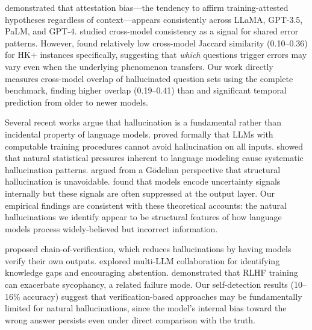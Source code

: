 \citet{mckenna2023sources} demonstrated that attestation bias---the tendency to affirm training-attested hypotheses regardless of context---appears consistently across LLaMA, GPT-3.5, PaLM, and GPT-4.
\citet{finch2025crossmodel} studied cross-model consistency as a signal for shared error patterns.
However, \citet{simhi2024distinguishing} found relatively low cross-model Jaccard similarity (0.10--0.36) for HK$+$ instances specifically, suggesting that \emph{which} questions trigger errors may vary even when the underlying phenomenon transfers.
Our work directly measures cross-model overlap of hallucinated question sets using the complete \truthfulqa benchmark, finding higher overlap (0.19--0.41) than \citet{simhi2024distinguishing} and significant temporal prediction from older to newer models.

Several recent works argue that hallucination is a fundamental rather than incidental property of language models.
\citet{xu2024hallucination} proved formally that LLMs with computable training procedures cannot avoid hallucination on all inputs.
\citet{kalai2025hallucinate} showed that natural statistical pressures inherent to language modeling cause systematic hallucination patterns.
\citet{banerjee2024llms} argued from a G\"{o}delian perspective that structural hallucination is unavoidable.
\citet{hager2025phenomenology} found that models encode uncertainty signals internally but these signals are often suppressed at the output layer.
Our empirical findings are consistent with these theoretical accounts: the natural hallucinations we identify appear to be structural features of how language models process widely-believed but incorrect information.

\citet{dhuliawala2023chain} proposed chain-of-verification, which reduces hallucinations by having models verify their own outputs.
\citet{feng2024dont} explored multi-LLM collaboration for identifying knowledge gaps and encouraging abstention.
\citet{sharma2024sycophancy} demonstrated that RLHF training can exacerbate sycophancy, a related failure mode.
Our self-detection results (10--16\% accuracy) suggest that verification-based approaches may be fundamentally limited for natural hallucinations, since the model's internal bias toward the wrong answer persists even under direct comparison with the truth.
